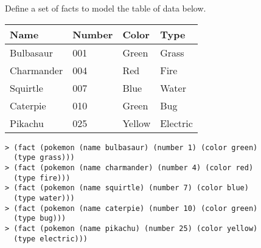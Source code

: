 \question Define a set of facts to model the table of data below.
\begin{center}
\begin{tabular}{ | l | l | l | l |}
\hline
Name & Number & Color &  Type \\ \hline
Bulbasaur & 001 & Green & Grass \\ \hline
Charmander & 004 & Red & Fire \\ \hline
Squirtle & 007 & Blue & Water \\ \hline
Caterpie & 010 & Green & Bug \\ \hline
Pikachu & 025 & Yellow & Electric \\ \hline
\end{tabular}
\end{center}
\begin{solution}[1in]
\begin{lstlisting}
> (fact (pokemon (name bulbasaur) (number 1) (color green)
  (type grass)))
> (fact (pokemon (name charmander) (number 4) (color red)
  (type fire)))
> (fact (pokemon (name squirtle) (number 7) (color blue)
  (type water)))
> (fact (pokemon (name caterpie) (number 10) (color green)
  (type bug)))
> (fact (pokemon (name pikachu) (number 25) (color yellow)
  (type electric)))
\end{lstlisting}
\end{solution}


